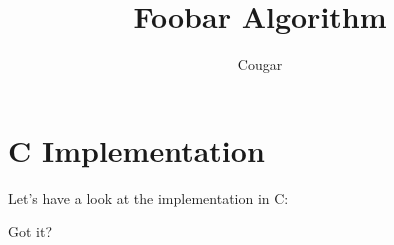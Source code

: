 \documentclass{article}
\begin{document}
\title{Foobar Algorithm}
\author{Cougar}

\maketitle

\makeatletter


\section{C Implementation}

Let's have a look at the implementation in C:


\noindent Got it?
\end{document}

